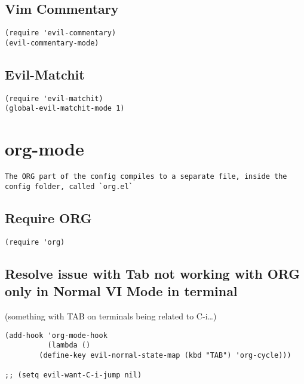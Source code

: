 \documentclass[11pt]{article}
\begin{document}
\subsection*{Vim Commentary}
\label{sec:org0722754}
\begin{verbatim}
(require 'evil-commentary)
(evil-commentary-mode)
\end{verbatim}

\subsection*{Evil-Matchit}
\label{sec:orgf8c7b08}
\begin{verbatim}
(require 'evil-matchit)
(global-evil-matchit-mode 1)
\end{verbatim}


\section*{org-mode}
\label{sec:orgb1cc435}

\begin{verbatim}
The ORG part of the config compiles to a separate file, inside the config folder, called `org.el`
\end{verbatim}

\subsection*{Require ORG}
\label{sec:org291f647}

\begin{verbatim}
(require 'org)
\end{verbatim}

\subsection*{Resolve issue with Tab not working with ORG only in Normal VI Mode in terminal}
\label{sec:orgdc67caf}

(something with TAB on terminals being related to C-i\ldots{})

\begin{verbatim}
(add-hook 'org-mode-hook                                                                      
          (lambda ()                                                                          
        (define-key evil-normal-state-map (kbd "TAB") 'org-cycle))) 

;; (setq evil-want-C-i-jump nil)
\end{verbatim}
\end{document}
